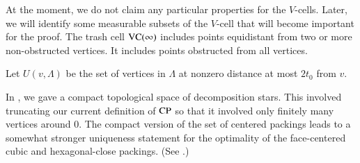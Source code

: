 \begin{remark}\label{remark:pathology}
At the moment, we do not claim any particular properties for the
$V$-cells.  Later, we will identify some measurable subsets of the
$V$-cell that will become important for the proof.  The trash cell
${\operatorname{VC}}(\infty)$ includes points equidistant from two or more
non-obstructed vertices.  It includes points obstructed from all
vertices.
\end{remark}


\label{sec:indexing} \label{sec:compact}

Let $U(v,\Lambda)$
be the set of vertices in $\Lambda$ at nonzero distance at most
$2t_0$ from $v$.  


\begin{remark} In \cite{DCG}, we gave a compact topological
space of decomposition stars.  This involved truncating our current
definition of ${\operatorname{CP}}$ so that it involved only finitely many
vertices around $0$.  The compact version of the set of centered
packings leads to a somewhat stronger uniqueness statement for the
optimality of the face-centered cubic and hexagonal-close
packings.  (See \cite{DCG}.)
\end{remark}









%

